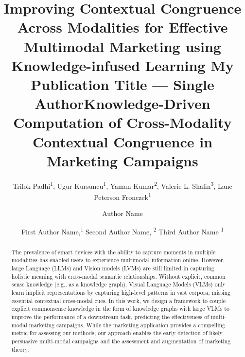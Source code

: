 \documentclass[letterpaper]{article} %
\title{
Improving Contextual Congruence Across Modalities for Effective Multimodal Marketing using Knowledge-infused Learning %
}
\author{
    Trilok Padhi\textsuperscript{\rm 1},
    Ugur Kursuncu\textsuperscript{\rm 1},
    Yaman Kumar\textsuperscript{\rm 2},
    Valerie L. Shalin\textsuperscript{\rm 3},
    Lane Peterson Fronczek\textsuperscript{\rm 1}
}
\title{My Publication Title --- Single Author}
\author {
    Author Name
}
\title{Knowledge-Driven Computation of Cross-Modality Contextual Congruence in Marketing Campaigns }
\author {
    First Author Name,\textsuperscript{\rm 1}
    Second Author Name, \textsuperscript{\rm 2}
    Third Author Name \textsuperscript{\rm 1}
}
\begin{document}
\maketitle

\begin{abstract}
The prevalence of smart devices with the ability to capture moments in multiple modalities has enabled users to experience multimodal information online. 
However, large Language (LLMs) and Vision models (LVMs) 
are still limited in capturing 
holistic meaning with cross-modal semantic relationships.
Without explicit, common sense knowledge (e.g., as a knowledge graph), Visual Language Models (VLMs) only learn implicit representations by capturing high-level patterns in vast corpora, missing essential contextual cross-modal cues.
In this work, we design a framework to couple explicit commonsense knowledge in the form of knowledge graphs with large VLMs to improve the 
performance of a downstream task, predicting the effectiveness of multi-modal marketing campaigns. While the marketing application provides a compelling metric for assessing our methods, our approach enables the early detection of likely persuasive multi-modal campaigns and the assessment and augmentation of marketing theory.   

% 


\end{abstract}
\end{document}
